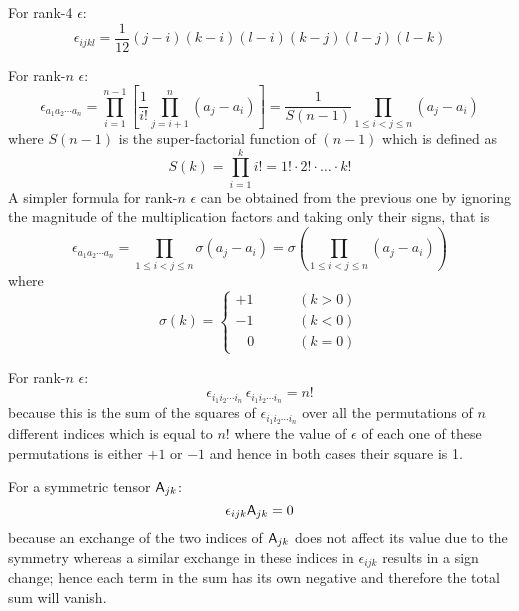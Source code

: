  For rank-4 $\epsilon$:
\begin{equation}
\epsilon_{ijkl}=\dfrac{1}{12}\left(j-i\right)\left(k-i\right)\left(l-i\right)\left(k-j\right)\left(l-j\right)\left(l-k\right)
\end{equation}


 For rank-$n$ $\epsilon$:
\begin{equation}
\epsilon_{a_{1}a_{2}\cdots a_{n}}=\prod_{i=1}^{n-1}\left[\dfrac{1}{i!}\prod_{j=i+1}^{n}\left(a_{j}-a_{i}\right)\right]=\dfrac{1}{S(n-1)}\prod_{1\le i<j\le n}\left(a_{j}-a_{i}\right)
\end{equation}
where $S(n-1)$ is the super-factorial function of $(n-1)$ which
is defined as
\begin{equation}
S(k)=\prod_{i=1}^{k}i!=1!\cdot2!\cdot\ldots\cdot k!
\end{equation}
A simpler formula for rank-$n$ $\epsilon$ can be obtained from the
previous one by ignoring the magnitude of the multiplication factors
and taking only their signs, that is
\begin{equation}
\epsilon_{a_{1}a_{2}\cdots a_{n}}=\prod_{1\le i<j\le n}\sigma\left(a_{j}-a_{i}\right)=\sigma\left(\prod_{1\le i<j\le n}\left(a_{j}-a_{i}\right)\right)
\end{equation}
where
\begin{equation}
\sigma(k)=\begin{cases}
+1 & (k>0)\\
-1 & (k<0)\\
\,\,\,\,\,0\,\,\,\,\,\,\,\,\,\,\,\,\,\, & (k=0)
\end{cases}
\end{equation}


 For rank-$n$ $\epsilon$:
\begin{equation}
\epsilon_{i_{1}i_{2}\cdots i_{n}}\,\epsilon_{i_{1}i_{2}\cdots i_{n}}=n!
\end{equation}
because this is the sum of the squares of $\epsilon_{i_{1}i_{2}\cdots i_{n}}$
over all the permutations of $n$ different indices which is equal
to $n!$ where the value of $\epsilon$ of each one of these permutations
is either $+1$ or $-1$ and hence in both cases their square is 1.

 For a symmetric tensor $\mathsf{A}_{jk}$:
\begin{equation}
\epsilon_{ijk}\mathsf{A}_{jk}=0
\end{equation}
because an exchange of the two indices of $\mathsf{A}_{jk}$ does not affect
its value due to the symmetry whereas a similar exchange in these
indices in $\epsilon_{ijk}$ results in a sign change; hence each
term in the sum has its own negative and therefore the total sum will
vanish.



